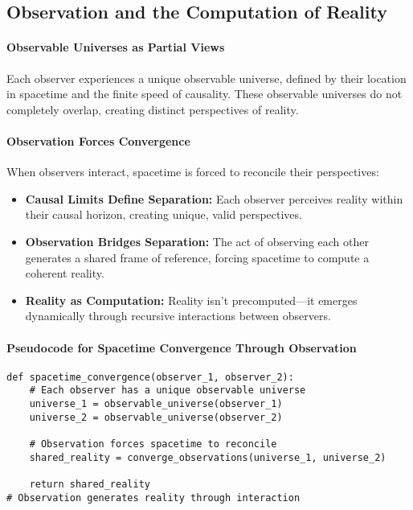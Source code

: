 \documentclass[12pt]{article}
\begin{document}
\subsection{Observation and the Computation of Reality}

\paragraph{Observable Universes as Partial Views}
Each observer experiences a unique observable universe, defined by their location in spacetime and the finite speed of causality. These observable universes do not completely overlap, creating distinct perspectives of reality.

\paragraph{Observation Forces Convergence}
When observers interact, spacetime is forced to reconcile their perspectives:
\begin{itemize}
    \item \textbf{Causal Limits Define Separation:}  
    Each observer perceives reality within their causal horizon, creating unique, valid perspectives.
    \item \textbf{Observation Bridges Separation:}  
    The act of observing each other generates a shared frame of reference, forcing spacetime to compute a coherent reality.
    \item \textbf{Reality as Computation:}  
    Reality isn’t precomputed—it emerges dynamically through recursive interactions between observers.
\end{itemize}

\paragraph{Pseudocode for Spacetime Convergence Through Observation}
\begin{verbatim}
def spacetime_convergence(observer_1, observer_2):
    # Each observer has a unique observable universe
    universe_1 = observable_universe(observer_1)
    universe_2 = observable_universe(observer_2)
    
    # Observation forces spacetime to reconcile
    shared_reality = converge_observations(universe_1, universe_2)
    
    return shared_reality
# Observation generates reality through interaction
\end{verbatim}
\end{document}
